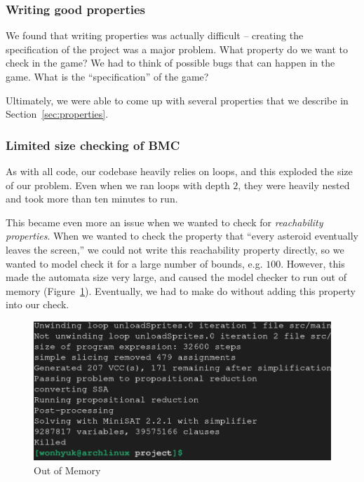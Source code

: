 \documentclass{article}
\begin{document}
        \subsubsection{Writing good properties}

            We found that writing properties was actually difficult -- creating
            the specification of the project was a major problem. What property
            do we want to check in the game? We had to think of possible bugs
            that can happen in the game. What is the ``specification'' of the
            game?

            Ultimately, we were able to come up with several properties that we
            describe in Section~\ref{sec:properties}.

        \subsubsection{Limited size checking of BMC}
            As with all code, our codebase heavily relies on loops, and this
            exploded the size of our problem. Even when we ran loops with depth
            $2$, they were heavily nested and took more than ten minutes to run.

            This became even more an issue when we wanted to check for
            \emph{reachability properties}. When we wanted to check the property
            that ``every asteroid eventually leaves the screen,'' we could not
            write this reachability property directly, so we wanted to model
            check it for a large number of bounds, e.g. $100$. However, this
            made the automata size very large, and caused the model checker to
            run out of memory (Figure~\ref{fig:killed}). Eventually, we had to
            make do without adding this property into our check.

            \begin{figure}[h!]
                \includegraphics[width=\linewidth]{killed.png}
                \caption{Out of Memory}
                \label{fig:killed}
            \end{figure}
\end{document}
